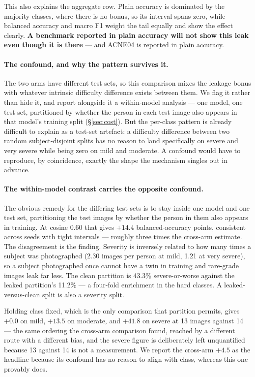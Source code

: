 \documentclass[11pt]{article}
\begin{document}
This also explains the aggregate row. Plain accuracy is dominated by the majority classes,
where there is no bonus, so its interval spans zero, while balanced accuracy and macro F1
weight the tail equally and show the effect clearly. \textbf{A benchmark reported in plain
accuracy will not show this leak even though it is there} --- and ACNE04 is reported in
plain accuracy.

\paragraph{The confound, and why the pattern survives it.}
The two arms have different test sets, so this comparison mixes the leakage bonus with
whatever intrinsic difficulty difference exists between them. We flag it rather than hide
it, and report alongside it a within-model analysis --- one model, one test set,
partitioned by whether the person in each test image also appears in that model's training
split (\S\ref{sec:cost}). But the per-class pattern is already difficult to explain as a
test-set artefact: a difficulty difference between two random subject-disjoint splits has
no reason to land specifically on severe and very severe while being zero on mild and
moderate. A confound would have to reproduce, by coincidence, exactly the shape the
mechanism singles out in advance.

\paragraph{The within-model contrast carries the opposite confound.}
The obvious remedy for the differing test sets is to stay inside one model and one test
set, partitioning the test images by whether the person in them also appears in training.
At cosine 0.60 that gives $+14.4$ balanced-accuracy points, consistent across seeds with
tight intervals --- roughly three times the cross-arm estimate. The disagreement is the
finding. Severity is inversely related to how many times a subject was photographed (2.30
images per person at mild, 1.21 at very severe), so a subject photographed once cannot
have a twin in training and rare-grade images leak far less. The clean partition is
43.3\% severe-or-worse against the leaked partition's 11.2\% --- a four-fold enrichment in
the hard classes. A leaked-versus-clean split is also a severity split.

Holding class fixed, which is the only comparison that partition permits, gives $+0.0$ on
mild, $+13.5$ on moderate, and $+41.8$ on severe at 13 images against 14 --- the same
ordering the cross-arm comparison found, reached by a different route with a different
bias, and the severe figure is deliberately left unquantified because 13 against 14 is not
a measurement. We report the cross-arm $+4.5$ as the headline because its confound has no
reason to align with class, whereas this one provably does.
\end{document}
